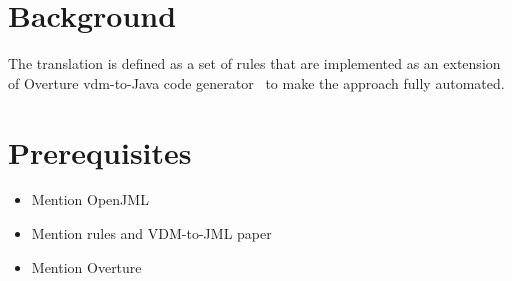 \section{Background}

The translation is defined as a set of rules that are implemented as
an extension of Overture \ac{vdm}-to-Java code
generator~\cite{Jorgensen&14a} to make the approach fully automated.

\section{Prerequisites}

\begin{itemize}
\item Mention OpenJML
\item Mention rules and VDM-to-JML paper
\item Mention Overture
\end{itemize}

